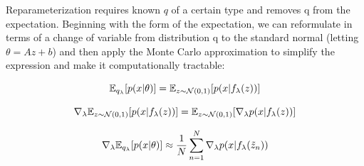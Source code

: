 \documentclass{article}
\begin{document}
Reparameterization requires known $q$ of a certain type and removes q from the expectation.  
Beginning with the form of the expectation, we can reformulate in terms of a change of variable from distribution q to the standard normal (letting $\theta = Az+b$) and then apply the Monte Carlo approximation to simplify the expression and make it computationally tractable:

$$
\mathbb{E}_{q_{\lambda}} [p(x|\theta)] = \mathbb{E}_{z \sim \mathcal{N}(0,1)} [p(x|f_{\lambda}(z))]
$$

$$
\nabla_{\lambda} \mathbb{E}_{z \sim \mathcal{N}(0,1)} [p(x|f_{\lambda}(z))] = \mathbb{E}_{z \sim \mathcal{N}(0,1)} [ \nabla_{\lambda} p(x|f_{\lambda}(z))]
$$

$$
\nabla_{\lambda} \mathbb{E}_{q_{\lambda}} [p(x|\theta)] \approx \frac{1}{N} \sum_{n=1}^{N} \nabla_{\lambda} p(x|f_{\lambda}(\tilde{z}_n))
$$
\end{document}
